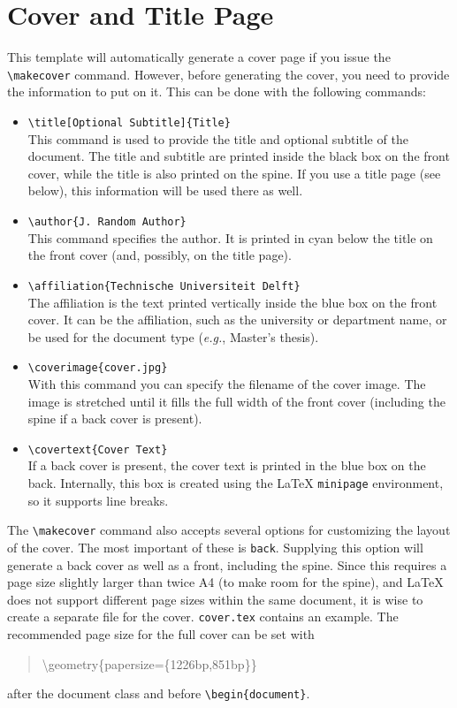 \section{Cover and Title Page}

This template will automatically generate a cover page if you issue the \texttt{\textbackslash makecover} command. However, before generating the cover, you need to provide the information to put on it. This can be done with the following commands:
\begin{itemize}
\item\texttt{\textbackslash title[Optional Subtitle]\{Title\}} \\
    This command is used to provide the title and optional subtitle of the document. The title and subtitle are printed inside the black box on the front cover, while the title is also printed on the spine. If you use a title page (see below), this information will be used there as well.
\item\texttt{\textbackslash author\{J.\ Random Author\}} \\
    This command specifies the author. It is printed in cyan below the title on the front cover (and, possibly, on the title page).
\item\texttt{\textbackslash affiliation\{Technische Universiteit Delft\}} \\
    The affiliation is the text printed vertically inside the blue box on the front cover. It can be the affiliation, such as the university or department name, or be used for the document type (\emph{e.g.}, Master's thesis).
\item\texttt{\textbackslash coverimage\{cover.jpg\}} \\
    With this command you can specify the filename of the cover image. The image is stretched until it fills the full width of the front cover (including the spine if a back cover is present).
\item\texttt{\textbackslash covertext\{Cover Text\}} \\
    If a back cover is present, the cover text is printed in the blue box on the back. Internally, this box is created using the \LaTeX{} \texttt{minipage} environment, so it supports line breaks.
\end{itemize}

The \texttt{\textbackslash makecover} command also accepts several options for customizing the layout of the cover. The most important of these is \texttt{back}. Supplying this option will generate a back cover as well as a front, including the spine. Since this requires a page size slightly larger than twice A4 (to make room for the spine), and \LaTeX{} does not support different page sizes within the same document, it is wise to create a separate file for the cover. \texttt{cover.tex} contains an example. The recommended page size for the full cover can be set with
\begin{quote}
    \textbackslash geometry\{papersize=\{1226bp,851bp\}\}
\end{quote}
after the document class and before \texttt{\textbackslash begin\{document\}}.

